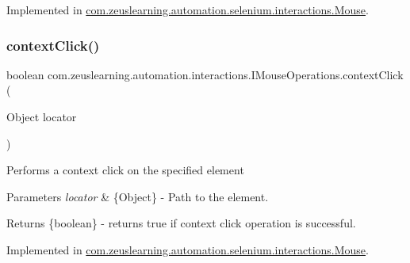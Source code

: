 Implemented in \hyperlink{classcom_1_1zeuslearning_1_1automation_1_1selenium_1_1interactions_1_1Mouse_a08be5c1a9eb96f3c8c518b9518f83769}{com.\+zeuslearning.\+automation.\+selenium.\+interactions.\+Mouse}.

\hypertarget{interfacecom_1_1zeuslearning_1_1automation_1_1interactions_1_1IMouseOperations_aa9b50c75a45f8c91063ba22a985614ca}{}\label{interfacecom_1_1zeuslearning_1_1automation_1_1interactions_1_1IMouseOperations_aa9b50c75a45f8c91063ba22a985614ca} 
\subsubsection{\texorpdfstring{context\+Click()}{contextClick()}}
{\footnotesize\ttfamily boolean com.\+zeuslearning.\+automation.\+interactions.\+I\+Mouse\+Operations.\+context\+Click (\begin{DoxyParamCaption}\item[{Object}]{locator }\end{DoxyParamCaption})}

Performs a context click on the specified element


\begin{DoxyParams}{Parameters}
{\em locator} & \{Object\} -\/ Path to the element. \\
\hline
\end{DoxyParams}
\begin{DoxyReturn}{Returns}
\{boolean\} -\/ returns {\ttfamily true} if context click operation is successful. 
\end{DoxyReturn}


Implemented in \hyperlink{classcom_1_1zeuslearning_1_1automation_1_1selenium_1_1interactions_1_1Mouse_afdefed49a206fa9bfcc3dc3f088f8580}{com.\+zeuslearning.\+automation.\+selenium.\+interactions.\+Mouse}.

\hypertarget{interfacecom_1_1zeuslearning_1_1automation_1_1interactions_1_1IMouseOperations_abc12dd95f19a0f53ae83a97dbfb7b001}{}\label{interfacecom_1_1zeuslearning_1_1automation_1_1interactions_1_1IMouseOperations_abc12dd95f19a0f53ae83a97dbfb7b001} 
